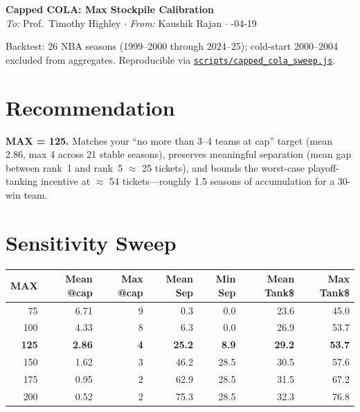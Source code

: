 \documentclass[10pt,letterpaper]{article}
\begin{document}
\begin{center}
{\LARGE\textbf{Capped COLA: Max Stockpile Calibration}}\\[0.25em]
{\small \textit{To:} Prof.\ Timothy Highley \quad $\cdot$ \quad \textit{From:} Kaushik Rajan \quad $\cdot$ -04-19}
\end{center}

\vspace{-0.2em}

{\small Backtest: 26 NBA seasons (1999--2000 through 2024--25); cold-start 2000--2004 excluded from aggregates. Reproducible via \href{../scripts/capped_cola_sweep.js}{\texttt{scripts/capped\_cola\_sweep.js}}.}

\section*{Recommendation}

\textbf{MAX = 125.} Matches your ``no more than 3--4 teams at cap'' target (mean 2.86, max 4 across 21 stable seasons), preserves meaningful separation (mean gap between rank~1 and rank~5 $\approx$ 25 tickets), and bounds the worst-case playoff-tanking incentive at $\approx$ 54 tickets---roughly 1.5 seasons of accumulation for a 30-win team.

\section*{Sensitivity Sweep}

\begin{center}
\begin{tabular}{r|rr|rr|rr}
\toprule
\textbf{MAX} & \textbf{Mean @cap} & \textbf{Max @cap} & \textbf{Mean Sep} & \textbf{Min Sep} & \textbf{Mean Tank\$} & \textbf{Max Tank\$} \\
\midrule
 75 & 6.71 & 9 &  0.3 &  0.0 & 23.6 & 45.0 \\
100 & 4.33 & 8 &  6.3 &  0.0 & 26.9 & 53.7 \\
\rowcolor{yellow!18}
\textbf{125} & \textbf{2.86} & \textbf{4} & \textbf{25.2} & \textbf{8.9} & \textbf{29.2} & \textbf{53.7} \\
150 & 1.62 & 3 & 46.2 & 28.5 & 30.5 & 57.6 \\
175 & 0.95 & 2 & 62.9 & 28.5 & 31.5 & 67.2 \\
200 & 0.52 & 2 & 75.3 & 28.5 & 32.3 & 76.8 \\
\bottomrule
\end{tabular}
\end{center}
\end{document}
